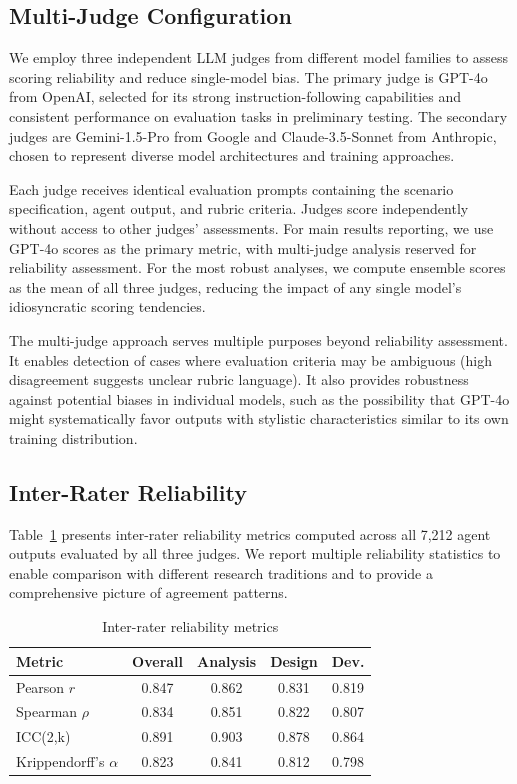 \subsection{Multi-Judge Configuration}

We employ three independent LLM judges from different model families to assess scoring reliability and reduce single-model bias. The primary judge is GPT-4o from OpenAI, selected for its strong instruction-following capabilities and consistent performance on evaluation tasks in preliminary testing. The secondary judges are Gemini-1.5-Pro from Google and Claude-3.5-Sonnet from Anthropic, chosen to represent diverse model architectures and training approaches.

Each judge receives identical evaluation prompts containing the scenario specification, agent output, and rubric criteria. Judges score independently without access to other judges' assessments. For main results reporting, we use GPT-4o scores as the primary metric, with multi-judge analysis reserved for reliability assessment. For the most robust analyses, we compute ensemble scores as the mean of all three judges, reducing the impact of any single model's idiosyncratic scoring tendencies.

The multi-judge approach serves multiple purposes beyond reliability assessment. It enables detection of cases where evaluation criteria may be ambiguous (high disagreement suggests unclear rubric language). It also provides robustness against potential biases in individual models, such as the possibility that GPT-4o might systematically favor outputs with stylistic characteristics similar to its own training distribution.

\subsection{Inter-Rater Reliability}

Table~\ref{tab:irr} presents inter-rater reliability metrics computed across all 7,212 agent outputs evaluated by all three judges. We report multiple reliability statistics to enable comparison with different research traditions and to provide a comprehensive picture of agreement patterns.

\begin{table}[ht!]
\centering
\small
\caption{Inter-rater reliability metrics}
\label{tab:irr}
\begin{tabular}{lcccc}
\toprule
\textbf{Metric} & \textbf{Overall} & \textbf{Analysis} & \textbf{Design} & \textbf{Dev.} \\
\midrule
Pearson $r$ & 0.847 & 0.862 & 0.831 & 0.819 \\
Spearman $\rho$ & 0.834 & 0.851 & 0.822 & 0.807 \\
ICC(2,k) & 0.891 & 0.903 & 0.878 & 0.864 \\
Krippendorff's $\alpha$ & 0.823 & 0.841 & 0.812 & 0.798 \\
\bottomrule
\end{tabular}
\end{table}

